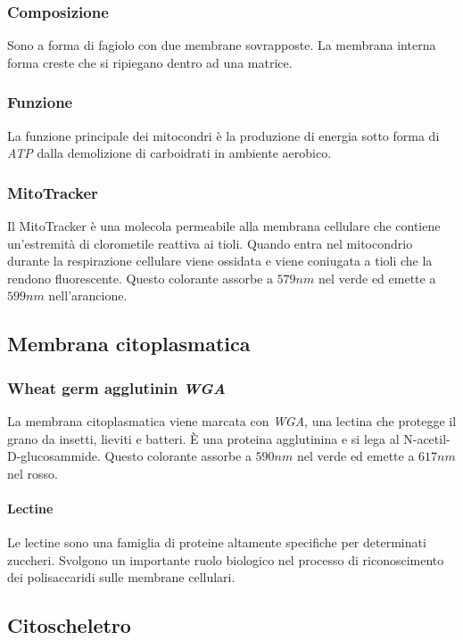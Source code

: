 		\subsubsection{Composizione}
		Sono a forma di fagiolo con due membrane sovrapposte.
		La membrana interna forma creste che si ripiegano dentro ad una matrice.

		\subsubsection{Funzione}
		La funzione principale dei mitocondri \`e la produzione di energia sotto forma di \emph{ATP} dalla demolizione di carboidrati in ambiente aerobico.

		\subsubsection{MitoTracker}
		Il MitoTracker \`e una molecola permeabile alla membrana cellulare che contiene un'estremit\`a di clorometile reattiva ai tioli.
		Quando entra nel mitocondrio durante la respirazione cellulare viene ossidata e viene coniugata a tioli che la rendono fluorescente.
		Questo colorante assorbe a $579\si{nm}$ nel verde ed emette a $599\si{nm}$ nell'arancione.

	\subsection{Membrana citoplasmatica}

		\subsubsection{Wheat germ agglutinin \emph{WGA}}
		La membrana citoplasmatica viene marcata con \emph{WGA}, una lectina che protegge il grano da insetti, lieviti e batteri.
		\`E una proteina agglutinina e si lega al N-acetil-D-glucosammide.
		Questo colorante assorbe a $590\si{nm}$ nel verde ed emette a $617\si{nm}$ nel rosso.
			
			\paragraph{Lectine}
			Le lectine sono una famiglia di proteine altamente specifiche per determinati zuccheri.
			Svolgono un importante ruolo biologico nel processo di riconoscimento dei polisaccaridi sulle membrane cellulari.
			

	\subsection{Citoscheletro}

